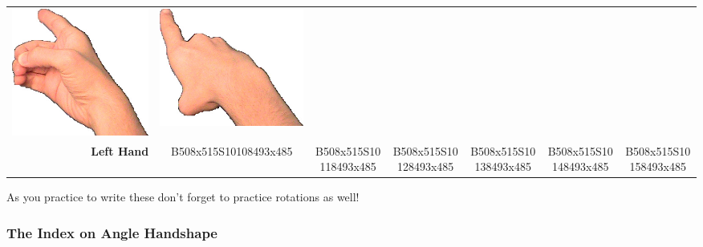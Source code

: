 \documentclass{article}
\begin{document}
\begin{center}
\begin{tabular}{r*{6}{c}}
\includegraphics[scale=0.1]{images/01-02-5.jpg}&
\includegraphics[scale=0.1]{images/01-02-6.jpg}\\
\textbf{Left Hand}&
B508x515S10108493x485&
B508x515S10118493x485&
B508x515S10128493x485&
B508x515S10138493x485&
B508x515S10148493x485&
B508x515S10158493x485\\
\end{tabular}
\end{center}

As you practice to write these don't forget to practice rotations as well!

\subsubsection{The Index on Angle Handshape}
\end{document}
